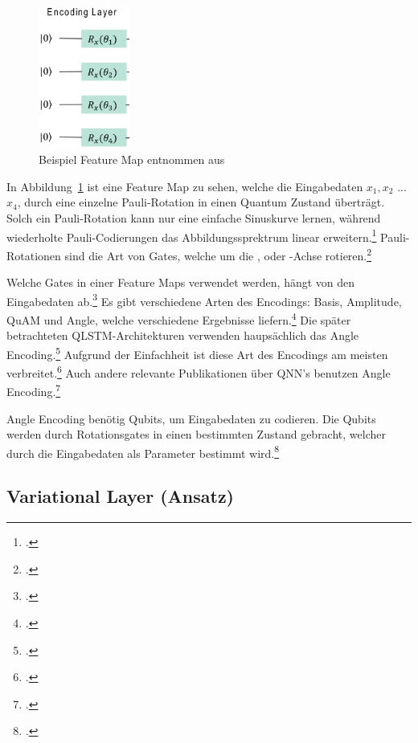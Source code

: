 \begin{figure}[htb]
    \centering
    \includegraphics[width=3cm]{lib/graphics/fm_yu.png}
    \caption[Beispiel Feature Map]{Beispiel Feature Map entnommen aus~\cite[][S. 3]{Yu2023}}
    \label{abb:fm_Yu2023}
\end{figure}

In Abbildung~\ref{abb:fm_Yu2023} ist eine Feature Map zu sehen, welche die Eingabedaten $x_1, x_2$ ... $x_4$, durch eine einzelne Pauli-Rotation in einen Quantum Zustand überträgt. Solch ein Pauli-Rotation kann nur eine einfache Sinuskurve lernen, während wiederholte Pauli-Codierungen das Abbildungssprektrum linear erweitern.\footcite[Vgl.][S. 2]{Schuld2021}
Pauli-Rotationen sind die Art von Gates, welche um die ,  oder -Achse rotieren.\footcite[Vgl.][S. 81]{Williams1998}

Welche Gates in einer Feature Maps verwendet werden, hängt von den Eingabedaten ab.\footcite[Vgl.][S. 9]{Weigold2022}
Es gibt verschiedene Arten des Encodings: Basis, Amplitude, QuAM und Angle, welche verschiedene Ergebnisse liefern.\footcite[Vgl.][S. 8]{Weigold2022}
Die später betrachteten \ac{QLSTM}-Architekturen verwenden haupsächlich das Angle Encoding.\footcite[Vgl.][]{Chen2022,Yu2023,Cao2023}
Aufgrund der Einfachheit ist diese Art des Encodings am meisten verbreitet.\footcite[Vgl.][S. 4]{OvalleMagallanes2023}
Auch andere relevante Publikationen über \ac{QNN}'s benutzen Angle Encoding.\footcite[Vgl.][]{Liu2021, Mari2020, Henderson2020, LaRose2020}

Angle Encoding benötig  Qubits, um  Eingabedaten zu codieren.
Die Qubits werden durch Rotationsgates in einen bestimmten Zustand gebracht, welcher durch die Eingabedaten als Parameter bestimmt wird.\footcite[Vgl.][S. 4]{OvalleMagallanes2023}




\subsection{Variational Layer (Ansatz)}\label{variationalLayer}

